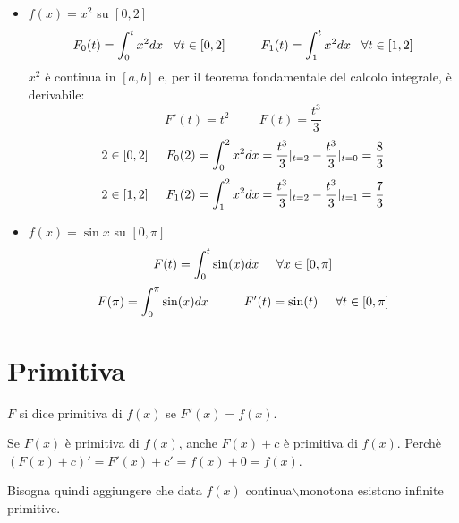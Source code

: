 \begin{example}\phantom{}
    \begin{itemize}
        \item $f(x)=x^2$ su $[0,2]$
        \begin{equation*}
            F_0(t)=\int^t_0x^2dx\hspace{0.3cm}\forall t\in[0,2]\hspace{1cm}F_1(t)=\int^t_1x^2dx\hspace{0.3cm}\forall t\in[1,2]
        \end{equation*}
        $x^2$ è continua in $[a,b]$ e, per il teorema fondamentale del calcolo integrale, è derivabile:
        \begin{equation*}
            F'(t)=t^2\hspace{1cm}F(t)=\frac{t^3}{3}
        \end{equation*}
        \begin{equation*}2\in[0,2]\hspace{0.5cm}F_0(2)=\int^2_0x^2dx=\frac{t^3}{3}|_{t=2}-\frac{t^3}{3}|_{t=0}=\frac{8}{3}\end{equation*}
        \begin{equation*}2\in[1,2]\hspace{0.5cm}F_1(2)=\int^2_1x^2dx=\frac{t^3}{3}|_{t=2}-\frac{t^3}{3}|_{t=1}=\frac{7}{3}\end{equation*}
        
        \item $f(x)=\sin x$ su $[0,\pi]$
        \begin{equation*}F(t)=\int^t_0\sin(x)dx\hspace{0.5cm}\forall x\in[0,\pi]\end{equation*}
        \begin{equation*}F(\pi)=\int^\pi_0\sin(x)dx\hspace{1cm}F'(t)=\sin(t)\hspace{0.5cm}\forall t\in[0,\pi]\end{equation*}
    \end{itemize}
\end{example}

\section{Primitiva}
\begin{definition*}[Primitiva]
    $F$ si dice primitiva di $f(x)$ se $F'(x)=f(x)$.
    
    Se $F(x)$ è primitiva di $f(x)$, anche $F(x)+c$ è primitiva di $f(x)$. Perchè $(F(x)+c)'=F'(x)+c'=f(x)+0=f(x)$.
    
    Bisogna quindi aggiungere che data $f(x)$ continua$\backslash$monotona esistono infinite primitive.
\end{definition*}

